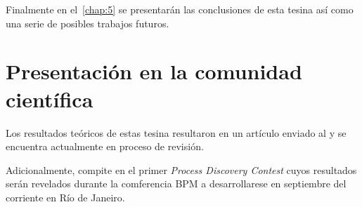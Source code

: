 Finalmente en el~\autoref{chap:5} se presentarán las conclusiones de esta tesina así como una serie de posibles trabajos futuros.

\section*{Presentación en la comunidad científica}
\label{sec:presentacion}

Los resultados teóricos de estas tesina resultaron en un artículo enviado al  y se encuentra actualmente
en  proceso de revisión.

Adicionalmente, \pachtool compite en el primer \textit{Process Discovery Contest} cuyos resultados serán revelados durante la comferencia
BPM a desarrollarese en septiembre del corriente en Río de Janeiro.
